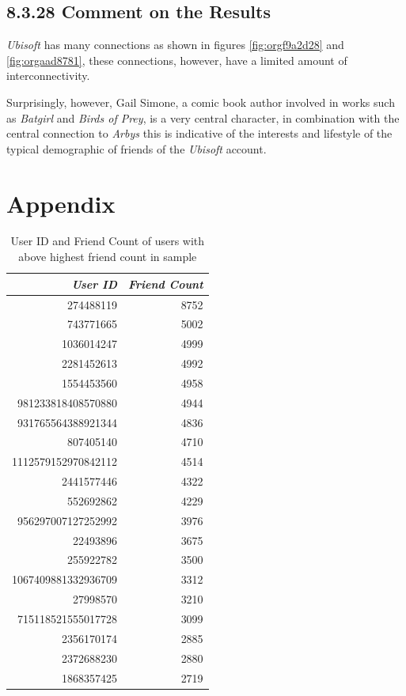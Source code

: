 \documentclass[11pt]{article}
\begin{document}
\subsection{8.3.28 Comment on the Results}
\label{sec:orgbf644a3}
\emph{Ubisoft} has many connections as shown in figures \ref{fig:orgf9a2d28} and \ref{fig:orgaad8781}, these connections, however, have a limited amount of interconnectivity.

Surprisingly, however, Gail Simone, a comic book author involved in works such as \emph{Batgirl} and \emph{Birds of Prey}, is a very central character, in combination with the central connection to \emph{Arbys} this is indicative of the interests and lifestyle of the typical demographic of friends of the \emph{Ubisoft} account.
\section{Appendix}
\label{sec:orgfab0d62}

\begin{table}[htbp]
\caption{\label{tab:org4e38288}User ID and Friend Count of users with above highest friend count in sample}
\centering
\begin{tabular}{rr}
\textbf{\emph{User ID}} & \textbf{\emph{Friend Count}}\\
\hline
274488119 & 8752\\
743771665 & 5002\\
1036014247 & 4999\\
2281452613 & 4992\\
1554453560 & 4958\\
981233818408570880 & 4944\\
931765564388921344 & 4836\\
807405140 & 4710\\
1112579152970842112 & 4514\\
2441577446 & 4322\\
552692862 & 4229\\
956297007127252992 & 3976\\
22493896 & 3675\\
255922782 & 3500\\
1067409881332936709 & 3312\\
27998570 & 3210\\
715118521555017728 & 3099\\
2356170174 & 2885\\
2372688230 & 2880\\
1868357425 & 2719\\
\end{tabular}
\end{table}
\end{document}
